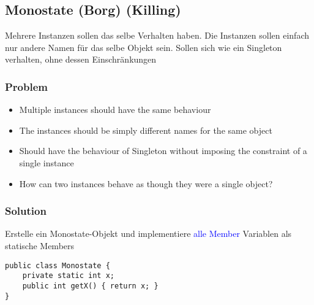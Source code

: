 \subsection{Monostate (Borg) (Killing)}

Mehrere Instanzen sollen das selbe Verhalten haben. Die Instanzen sollen einfach nur andere Namen für das selbe Objekt sein. Sollen sich wie ein Singleton verhalten, ohne dessen Einschränkungen

\subsubsection{Problem}
\begin{itemize}
    \item Multiple instances should have the same behaviour
    \item The instances should be simply different names for the same object
    \item Should have the behaviour of Singleton without imposing the constraint of a single instance
    \item How can two instances behave as though they were a single object?
\end{itemize}

\subsubsection{Solution}

Erstelle ein Monostate-Objekt und implementiere \textcolor{blue}{alle Member} Variablen als statische Members

\begin{lstlisting}
public class Monostate {
    private static int x;
    public int getX() { return x; }
}
\end{lstlisting}

